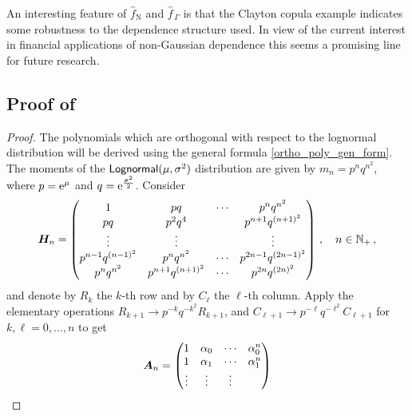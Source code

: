 An interesting feature of $\widehat{f}_{\mathrm{N}}$ and $\widehat{f}_{\,\Gamma}$ is that
the Clayton copula example indicates some robustness to the dependence structure used.
In view of the current interest in financial applications of non-Gaussian dependence this
seems a promising line for future research.


\begin{subappendices}
\section{Proof of } \label{app:lognormal_poly}
\begin{proof}
The polynomials which are orthogonal with respect to the lognormal distribution will be derived using the general formula \eqref{ortho_poly_gen_form}.
The moments of the $\mathsf{Lognormal}(\mu, \sigma^2)$ distribution are given by $m_{n}=p^{n}q^{n^{2}}$, where $p=\mathrm{e}^{\mu}$ and $q=\mathrm{e}^{\frac{\sigma^{2}}{2}}$. Consider
\begin{equation}\label{eq:Dn1}
\bm{H}_n=\begin{pmatrix}
1&pq&\cdots&p^{n}q^{n^{2}} \\
pq&p^{2}q^{4}&&p^{n+1}q^{(n+1)^{2}}\\
\vdots&\vdots&&\vdots\\
p^{n-1}q^{(n-1)^{2}}&p^{n}q^{n^{2}}&\cdots&p^{2n-1}q^{(2n-1)^{2}}\\
p^{n}q^{n^{2}}&p^{n+1}q^{(n+1)^{2}}&\cdots&p^{2n}q^{(2n)^{2}}
\end{pmatrix}
\,, \quad n \in \mathbb{N}_+\,,
\end{equation}
and denote by $R_{k}$ the $k$-th row and by $C_{\ell}$ the $\ell$-th column. Apply the elementary operations $R_{k+1}\rightarrow p^{-k}q^{-k^{2}}R_{k+1}$, and $C_{\ell+1}\rightarrow p^{-\ell}q^{-\ell^{2}}C_{\ell+1}$ for $k,\ell=0,\ldots,n$ to get
\begin{equation} \label{vand}
\bm{A}_n = \begin{pmatrix}
1 & \alpha_0 & \cdots & \alpha_0^n \\
1 & \alpha_1 & \cdots & \alpha_1^n \\
\vdots&\vdots&\vdots\\

\end{pmatrix}
\end{equation}
\end{proof}
\end{subappendices}
